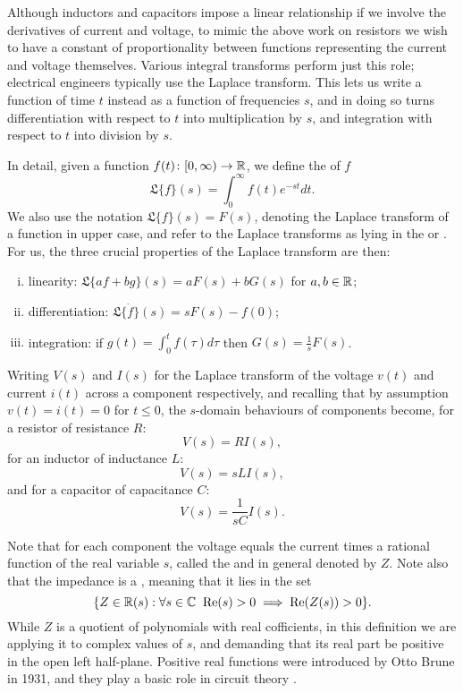Although inductors and capacitors impose a linear relationship if we involve the
derivatives of current and voltage, to mimic the above work on resistors we wish
to have a constant of proportionality between functions representing the current
and voltage themselves. Various integral transforms perform just this role; electrical
engineers typically use the Laplace transform. This lets us write a function of time $t$ instead as a function of frequencies $s$, and in doing so turns differentiation with respect to $t$ into multiplication by $s$, and integration with respect to $t$ into
division by $s$.  

In detail, given a function $f(t){\colon} [0, \infty) \to {\mathbb{R}}$, we define the
 of $f$
\[
  \mathfrak{L}\{f\}(s) = \int_{0}^\infty f(t) e^{-st} dt.
\]
We also use the notation $\mathfrak{L}\{f\}(s) = F(s)$, denoting the Laplace
transform of a function in upper case, and refer to the Laplace transforms as
lying in the  or . For us, the three
crucial properties of the Laplace transform are then: 
\begin{enumerate}[(i)]
  \item linearity: $\mathfrak{L}\{af+bg\}(s) = aF(s)+bG(s)$ for $a,b\in {\mathbb{R}}$;
  \item differentiation: $\mathfrak{L}\{\dot{f}\}(s) = s F(s) - f(0)$;
  \item integration: if $g(t) = \int_0^t f(\tau)d\tau$ then 
 $G(s) = \frac{1}{s} F(s)$.
\end{enumerate}
Writing $V(s)$ and $I(s)$ for the Laplace transform of the voltage $v(t)$ and
current $i(t)$ across a component respectively, and recalling that by assumption
$v(t) = i(t) = 0$ for $t \le 0$, the $s$-domain behaviours of components become,
for a resistor of resistance $R$:
\[
  V(s) = RI(s),
\]
for an inductor of inductance $L$:
\[
  V(s) = sLI(s),
\]
and for a capacitor of capacitance $C$:
\[
  V(s) = \frac1{sC} I(s). 
\]

Note that for each component the voltage equals the current times a rational function of
the real variable $s$, called the  and in general denoted by $Z$.
Note also that the impedance is a , meaning that it lies
in the set
\[         
  \{ Z \in {\mathbb{R}}(s) : \forall s \in {\mathbb C} \;\; \mathrm{Re}(s) > 0 \implies
  \mathrm{Re}(Z(s)) > 0 \} . 
\]
While $Z$ is a quotient of polynomials with real cofficients, in this definition
we are applying it to complex values of $s$, and demanding that its real part be
positive in the open left half-plane.  Positive real functions were introduced by Otto 
Brune in 1931, and they play a basic role in circuit theory \cite{Brune}.  

